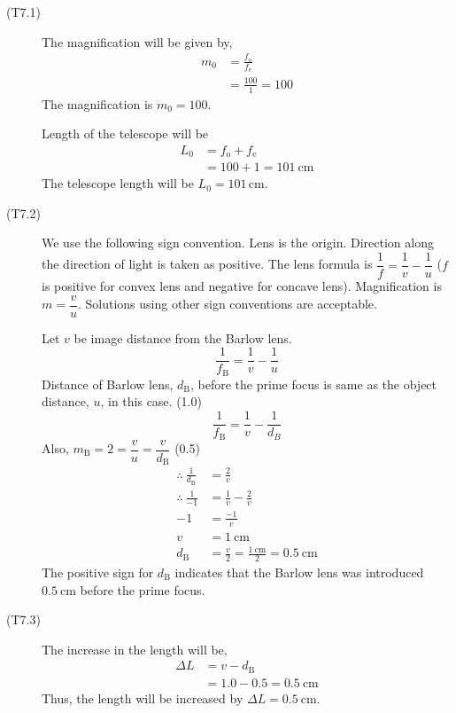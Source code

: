 \begin{description}
\item[(T7.1)] The magnification will be given by,
\begin{align*}
m_0 &= \frac{f_{\mathrm{o}}}{f_{\mathrm{e}}} \tag*{(1.0)}\\
&= \frac{100}{1} = 100 \tag*{(1.0)}
\end{align*}
The magnification is $m_0 = 100$.

Length of the telescope will be
\begin{align*}
L_0 &= f_{\mathrm{o}} + f_{\mathrm{e}} \tag*{(1.0)}\\
&= 100 + 1 = 101\ \mathrm{cm} \tag*{(1.0)}
\end{align*}
The telescope length will be $L_0 = 101$\,cm.

\item[(T7.2)] We use the following sign convention. Lens is the origin.
Direction along the direction of light is taken as positive. The lens formula
is $\dfrac{1}{f} = \dfrac{1}{v} - \dfrac{1}{u}$ ($f$ is positive for convex
lens and negative for concave lens). Magnification is $m = \dfrac{v}{u}$.
Solutions using other sign conventions are acceptable.

Let $v$ be image distance from the Barlow lens.
\[
\frac{1}{f_{\mathrm{B}}} = \frac{1}{v} - \frac{1}{u} \tag*{(1.0)}
\]
Distance of Barlow lens, $d_{\mathrm{B}}$, before the prime focus is same as
the object distance, $u$, in this case. \hfill(1.0)
\[
\frac{1}{f_{\mathrm{B}}} = \frac{1}{v} - \frac{1}{d_B}
\]
Also, $m_{\mathrm{B}} = 2 = \dfrac{v}{u} = \dfrac{v}{d_{\mathrm{B}}}$
\hfill(0.5)
\begin{align*}
\therefore\ \frac{1}{d_{\mathrm{B}}} &= \frac{2}{v} \tag*{(1.0)}\\
\therefore\ \frac{1}{-1} &= \frac{1}{v} - \frac{2}{v}\\
-1 &= \frac{-1}{v}\\
v &= 1\ \mathrm{cm}\\
d_{\mathrm{B}} &= \frac{v}{2} = \frac{1\ \mathrm{cm}}{2} = 0.5\ \mathrm{cm}
  \tag*{(2.5)}
\end{align*}
The positive sign for $d_{\mathrm{B}}$ indicates that the Barlow lens was
introduced $\boxed{0.5\ \mathrm{cm}}$ before the prime focus.

\item[(T7.3)] The increase in the length will be,
\begin{align*}
\Delta L &= v - d_{\mathrm{B}} \tag*{(2.0)}\\
&= 1.0 - 0.5 = 0.5\ \mathrm{cm} \tag*{(2.0)}
\end{align*}
Thus, the length will be increased by $\boxed{\Delta L = 0.5\ \mathrm{cm}}$.


\end{description}
